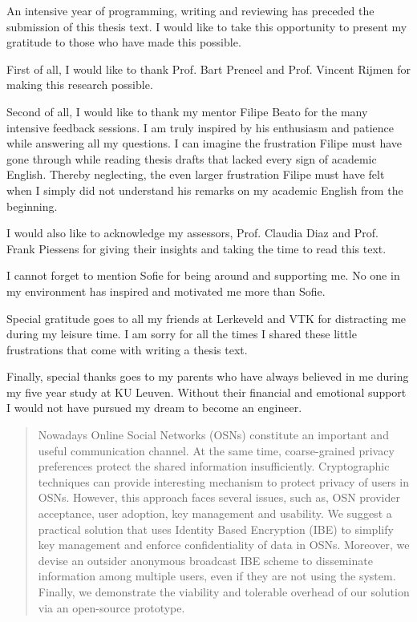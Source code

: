 \documentclass[master=eelt,masteroption=em]{kulemt}
\theoremstyle{plain}
\theoremstyle{definition}
\begin{document}

\begin{preface}
An intensive year of programming, writing and reviewing has preceded the submission of this thesis text. I would like to take this opportunity to present my gratitude to those who have made this possible. 

First of all, I would like to thank Prof. Bart Preneel and Prof. Vincent Rijmen for making this research possible.

Second of all, I would like to thank my mentor Filipe Beato for the many intensive feedback sessions. I am truly inspired by his enthusiasm and patience while answering all my questions. I can imagine the frustration Filipe must have gone through while reading thesis drafts that lacked every sign of academic English. Thereby neglecting, the even larger frustration Filipe must have felt when I simply did not understand his remarks on my academic English from the beginning.

I would also like to acknowledge my assessors, Prof. Claudia Diaz and Prof. Frank Piessens for giving their insights and taking the time to read this text.

I cannot forget to mention Sofie for being around and supporting me. No one in my environment has inspired and motivated me more than Sofie.

Special gratitude goes to all my friends at Lerkeveld and VTK for distracting me during my leisure time. I am sorry for all the times I shared these little frustrations that come with writing a thesis text.

Finally, special thanks goes to my parents who have always believed in me during my five year study at KU Leuven. Without their financial and emotional support I would not have pursued my dream to become an engineer.

\end{preface}

\tableofcontents*

\begin{abstract}
  Nowadays Online Social Networks (OSNs) constitute an important and useful communication channel. At the same time, coarse-grained privacy preferences protect the shared information insufficiently. Cryptographic techniques can provide interesting mechanism to protect privacy of users in OSNs. However, this approach faces several issues, such as, OSN provider acceptance, user adoption, key management and usability. We suggest a practical solution that uses Identity Based Encryption (IBE) to simplify key management and enforce confidentiality of data in OSNs. Moreover, we devise an outsider anonymous broadcast IBE scheme to disseminate information among multiple users, even if they are not using the system. Finally, we demonstrate the viability and tolerable overhead of our solution via an open-source prototype.

\end{abstract}
\end{document}
